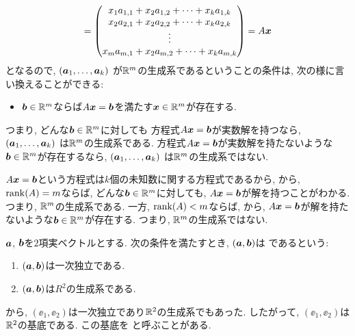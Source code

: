 \begin{remark}
\begin{align*}
    =\begin{pmatrix}x_1a_{1,1}+x_2a_{1,2}+\cdots+x_ka_{1,k}\\x_2a_{2,1}+x_2a_{2,2}+\cdots+x_ka_{2,k}\\\vdots\\x_ma_{m,1}+x_2a_{m,2}+\cdots+x_ka_{m,k}\end{pmatrix}
    =A\boldsymbol{x}
  \end{align*}
  となるので,
  $(\boldsymbol{a}_1,\ldots, \boldsymbol{a}_k)$
  が$\mathbb{R}^m$の生成系であるということの条件は, 次の様に言い換えることができる:
  \begin{itemize}
  \item $\boldsymbol{b}\in\mathbb{R}^m$ならば$A\boldsymbol{x}=\boldsymbol{b}$を満たす$\boldsymbol{x}\in \mathbb{R}^m$が存在する.
  \end{itemize}
  つまり,
  どんな$\boldsymbol{b}\in\mathbb{R}^m$に対しても
  方程式$A\boldsymbol{x}=\boldsymbol{b}$が実数解を持つなら, 
    $(\boldsymbol{a}_1,\ldots, \boldsymbol{a}_k)$
  は$\mathbb{R}^m$の生成系である.
  方程式$A\boldsymbol{x}=\boldsymbol{b}$が実数解を持たないような
  $\boldsymbol{b}\in\mathbb{R}^m$が存在するなら,
    $(\boldsymbol{a}_1,\ldots, \boldsymbol{a}_k)$
  は$\mathbb{R}^m$の生成系ではない.
  
  $A\boldsymbol{x}=\boldsymbol{b}$という方程式は$k$個の未知数に関する方程式であるから,
  から,
  $\operatorname{rank}(A)=m$ならば, どんな$\boldsymbol{b}\in\mathbb{R}^m$に対しても,
  $A\boldsymbol{x}=\boldsymbol{b}$が解を持つことがわかる.
  つまり, $\mathbb{R}^m$の生成系である.
  一方,
  $\operatorname{rank}(A)<m$ならば, 
  から,
  $A\boldsymbol{x}=\boldsymbol{b}$が解を持たないような$\boldsymbol{b}\in\mathbb{R}^m$が存在する.
  つまり, $\mathbb{R}^m$の生成系ではない.
\end{remark}

\begin{definition}
  \label{def:basis}
  $\boldsymbol{a}$, $\boldsymbol{b}$を$2$項実ベクトルとする.
  次の条件を満たすとき,
  $(\boldsymbol{a},\boldsymbol{b})$は
  であるという:
  \begin{enumerate}
  \item
    $(\boldsymbol{a},\boldsymbol{b})$は一次独立である.
  \item
    $(\boldsymbol{a},\boldsymbol{b})$は$R^2$の生成系である.
  \end{enumerate}
\end{definition}


\begin{example}
  \label{ex:stdbasis}
  から,
  $(\ee_1,\ee_2)$は一次独立であり$\mathbb{R}^2$の生成系でもあった.
  したがって,
  $(\ee_1,\ee_2)$は$\mathbb{R}^2$の基底である.
  この基底を
  と呼ぶことがある.
\end{example}


